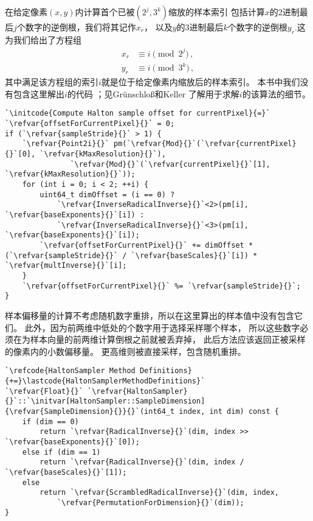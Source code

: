在给定像素$(x,y)$内计算首个已被$(2^j,3^k)$缩放的样本索引
包括计算$x$的2进制最后$j$个数字的逆倒根，我们将其记作$x_r$，
以及$y$的3进制最后$k$个数字的逆倒根$y_r$.这为我们给出了方程组
\begin{align*}
    x_r & \equiv i\pmod{2^j}\, , \\
    y_r & \equiv i\pmod{3^k}\, ,
\end{align*}
其中满足该方程组的索引$i$就是位于给定像素内缩放后的样本索引。
本书中我们没有包含这里解出$i$的代码{}
；见Gr\"{u}nschlo\ss{}和Keller \parencite*{10.1007/978-3-642-04107-5_25}
了解用于求解$i$的该算法的细节。
\begin{lstlisting}
`\initcode{Compute Halton sample offset for currentPixel}{=}`
`\refvar{offsetForCurrentPixel}{}` = 0;
if (`\refvar{sampleStride}{}` > 1) {
    `\refvar{Point2i}{}` pm(`\refvar{Mod}{}`(`\refvar{currentPixel}{}`[0], `\refvar{kMaxResolution}{}`),
               `\refvar{Mod}{}`(`\refvar{currentPixel}{}`[1], `\refvar{kMaxResolution}{}`));
    for (int i = 0; i < 2; ++i) {
        uint64_t dimOffset = (i == 0) ?
            `\refvar{InverseRadicalInverse}{}`<2>(pm[i], `\refvar{baseExponents}{}`[i]) :
            `\refvar{InverseRadicalInverse}{}`<3>(pm[i], `\refvar{baseExponents}{}`[i]);
        `\refvar{offsetForCurrentPixel}{}` += dimOffset * (`\refvar{sampleStride}{}` / `\refvar{baseScales}{}`[i]) * `\refvar{multInverse}{}`[i];
    }
    `\refvar{offsetForCurrentPixel}{}` %= `\refvar{sampleStride}{}`;
}
\end{lstlisting}

样本偏移量的计算不考虑随机数字重排，所以在这里算出的样本值中没有包含它们。
此外，因为前两维中低处的个数字用于选择采样哪个样本，
所以这些数字必须在为样本向量的前两维计算倒根之前就被丢弃掉，
此后方法应该返回正被采样的像素内的小数偏移量。
更高维则被直接采样，包含随机重排。
\begin{lstlisting}
`\refcode{HaltonSampler Method Definitions}{+=}\lastcode{HaltonSamplerMethodDefinitions}`
`\refvar{Float}{}` `\refvar{HaltonSampler}{}`::`\initvar[HaltonSampler::SampleDimension]{\refvar{SampleDimension}{}}{}`(int64_t index, int dim) const {
    if (dim == 0)
        return `\refvar{RadicalInverse}{}`(dim, index >> `\refvar{baseExponents}{}`[0]);
    else if (dim == 1)
        return `\refvar{RadicalInverse}{}`(dim, index / `\refvar{baseScales}{}`[1]);
    else
        return `\refvar{ScrambledRadicalInverse}{}`(dim, index,
            `\refvar{PermutationForDimension}{}`(dim));
}
\end{lstlisting}